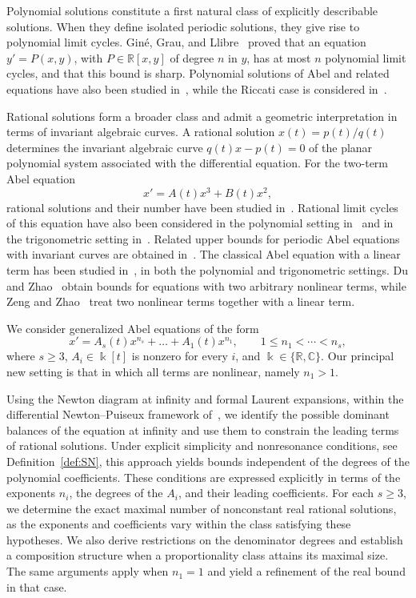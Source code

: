 \documentclass[12pt,a4paper]{amsart}
\numberwithin{theorem}{section}
\theoremstyle{definition}
\begin{document}
	Polynomial solutions constitute a first natural class of explicitly describable solutions. When they define isolated periodic solutions, they give rise to polynomial limit cycles. Giné, Grau, and Llibre~\cite{GineGrauLlibre2011} proved that an equation $y'=P(x,y)$, with $P\in\mathbb{R}[x,y]$ of degree $n$ in $y$, has at most $n$ polynomial limit cycles, and that this bound is sharp. Polynomial solutions of Abel and related equations have also been studied in~\cite{CimaGasullManosas2017,LlibreValls2018}, while the Riccati case is considered in~\cite{GasullTorregrosaZhang2016}.
	
	Rational solutions form a broader class and admit a geometric interpretation in terms of invariant algebraic curves. A rational solution $x(t)=p(t)/q(t)$ determines the invariant algebraic curve $q(t)x-p(t)=0$ of the planar polynomial system associated with the differential equation. For the two-term Abel equation
	\[
	x'=A(t)x^3+B(t)x^2,
	\]
	rational solutions and their number have been studied in~\cite{BravoCalderonFernandezOjeda2022,QianShenYang2021}. Rational limit cycles of this equation have also been considered in the polynomial setting in~\cite{LiuLiWangWu2018,LlibreValls2021} and in the trigonometric setting in~\cite{BravoCalderonOjeda2023,Valls2022}. Related upper bounds for periodic Abel equations with invariant curves are obtained in~\cite{BravoCalderonFernandez2021}. The classical Abel equation with a linear term has been studied in~\cite{Calderon2025}, in both the polynomial and trigonometric settings. Du and Zhao~\cite{DuZhao2026} obtain bounds for equations with two arbitrary nonlinear terms, while Zeng and Zhao~\cite{ZengZhaoUpperBound} treat two nonlinear terms together with a linear term.
	
	We consider generalized Abel equations of the form
	\begin{equation}\label{ecu:main}
		x'=A_s(t)x^{n_s}+\dots+A_1(t)x^{n_1},
		\qquad 1\leq n_1<\cdots<n_s,
	\end{equation}
	where $s\geq3$, $A_i\in\Bbbk[t]$ is nonzero for every $i$, and $\Bbbk\in\{\mathbb{R},\mathbb{C}\}$. Our principal new setting is that in which all terms are nonlinear, namely $n_1>1$.
	
	Using the Newton diagram at infinity and formal Laurent expansions, within the differential Newton--Puiseux framework of~\cite{Cano2005NewtonPolygon,DeminaPuiseux2022}, we identify the possible dominant balances of the equation at infinity and use them to constrain the leading terms of rational solutions. Under explicit simplicity and nonresonance conditions, see Definition~\ref{def:SN}, this approach yields bounds independent of the degrees of the polynomial coefficients. These conditions are expressed explicitly in terms of the exponents $n_i$, the degrees of the $A_i$, and their leading coefficients. For each $s\geq3$, we determine the exact maximal number of nonconstant real rational solutions, as the exponents and coefficients vary within the class satisfying these hypotheses. We also derive restrictions on the denominator degrees and establish a composition structure when a proportionality class attains its maximal size. The same arguments apply when $n_1=1$ and yield a refinement of the real bound in that case.
	
\end{document}
